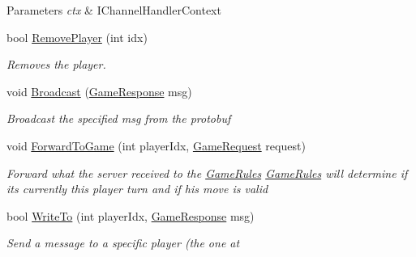 \begin{DoxyCompactItemize}
\begin{DoxyCompactList}
\begin{DoxyParams}{Parameters}
{\em ctx} & I\+Channel\+Handler\+Context\\
\hline
\end{DoxyParams}
\end{DoxyCompactList}\item 
bool \hyperlink{class_coinche_1_1_server_1_1_game_room_a91a044c5b36ad5114bd836a147a1d343}{Remove\+Player} (int idx)
\begin{DoxyCompactList}\small\item\em Removes the player. \end{DoxyCompactList}\item 
void \hyperlink{class_coinche_1_1_server_1_1_game_room_ae245ed33e990ce4721b15eaa29f8af1a}{Broadcast} (\hyperlink{class_coinche_1_1_google_1_1_protobuf_1_1_game_response}{Game\+Response} msg)
\begin{DoxyCompactList}\small\item\em Broadcast the specified msg from the protobuf \end{DoxyCompactList}\item 
void \hyperlink{class_coinche_1_1_server_1_1_game_room_a2fdaf1a02333b68864d248906816305d}{Forward\+To\+Game} (int player\+Idx, \hyperlink{class_coinche_1_1_google_1_1_protobuf_1_1_game_request}{Game\+Request} request)
\begin{DoxyCompactList}\small\item\em Forward what the server received to the \hyperlink{class_coinche_1_1_game_rules}{Game\+Rules} \hyperlink{class_coinche_1_1_game_rules}{Game\+Rules} will determine if it\textquotesingle{}s currently this player turn and if his move is valid \end{DoxyCompactList}\item 
bool \hyperlink{class_coinche_1_1_server_1_1_game_room_a04af07a82fdb50bc44286ff13821c415}{Write\+To} (int player\+Idx, \hyperlink{class_coinche_1_1_google_1_1_protobuf_1_1_game_response}{Game\+Response} msg)
\begin{DoxyCompactList}\small\item\em Send a message to a specific player (the one at \end{DoxyCompactList}\end{DoxyCompactItemize}
